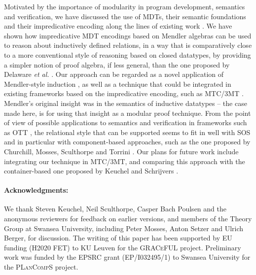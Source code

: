 \documentclass[submission,copyright,creativecommons]{eptcs}
\newcounter{prop}
\begin{document}
Motivated by the importance of modularity in program development,
semantics and verification, we have discussed the use of MDTs, their
semantic foundations and their impredicative encoding along the lines
of existing work \cite{Dela13,Keuchel13,Swier08}. We have shown how
impredicative MDT encodings based on Mendler algebras can be used to
reason about inductively defined relations, in a way that is
comparatively close to a more conventional style of reasoning based on
closed datatypes, by providing a simpler notion of proof algebra, if
less general, than the one proposed by Delaware \emph{et al.}
\cite{Dela13}. Our approach can be regarded as a novel application of
Mendler-style induction \cite{Mendler91,AbelMU05,UustaluV99}, as well
as a technique that could be integrated in existing frameworks based
on the impredicative encoding, such as MTC/3MT 
\cite{Dela13,Delaware13M}. Mendler's original insight \cite{Mendler91}
was in the semantics of inductive datatypes -- the case made here, is
for using that insight as a modular proof technique. From the point of
view of possible applications to semantics and verification in
frameworks such as OTT \cite{OTT}, the relational style that can be
supported seems to fit in well with SOS and in particular with
component-based approaches, such as the one proposed by Churchill,
Mosses, Sculthorpe and Torrini \cite{TAOSD}. Our plans for future work
include integrating our technique in MTC/3MT, and comparing this
approach with the container-based one proposed by Keuchel and
Schrijvers \cite{Keuchel13}.

\paragraph{Acknowledgments:}
We thank Steven Keuchel, Neil Sculthorpe, Casper Bach Poulsen and the
anonymous reviewers for feedback on earlier versions, and members of
the Theory Group at Swansea University, including Peter Mosses, Anton
Setzer and Ulrich Berger, for discussion. The writing of this paper
has been supported by EU funding (H2020 FET) to KU Leuven for the
\textsc{GRACeFUL} project. Preliminary work was funded by the EPSRC
grant (EP/I032495/1) to Swansea University for the \textsc{PLanCompS}
project.













\end{document}
